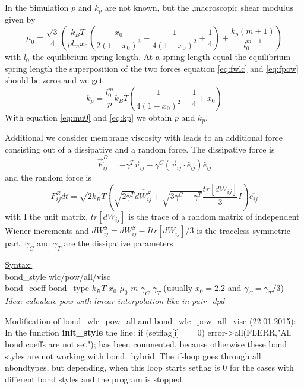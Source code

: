 \documentclass[a4paper,10pt]{scrreprt}
\begin{document}
In the Simulation $p$ and $k_p$ are not known, but the ,macroscopic shear modulus given by
%
\begin{equation}\label{eq:mu0}
	\mu_0 = \frac{\sqrt{3}}{4}\left(\frac{k_BT}{pl_mx_0}\left(\frac{x_0}{2(1-x_0)^3}-\frac{1}{4(1-x_0)^2}+\frac{1}{4}\right) + \frac{k_p(m+1)}{l_0^{m+1}}\right)
\end{equation}
%
with $l_0$ the equilibrium spring length. At a spring length equal the equilibrium spring length the superposition of the two forces equation \ref{eq:fwlc} and \ref{eq:fpow} should be zeros and we get
%
\begin{equation}\label{eq:kp}
	k_p = \frac{l_0^m}{p}k_BT \left(\frac{1}{4(1-x_0)^2}-\frac{1}{4}+x_0\right)
\end{equation}
%
With equation \ref{eq:mu0} and \ref{eq:kp}  we obtain $p$ and $k_p$.

Additional we consider membrane viscosity with leads to an additional force consisting out of a dissipative and a random force. The dissipative force is
% 
\begin{equation}
	\vec{F}^D_{ij} = -\gamma^T\vec{v}_{ij} -\gamma^C(\vec{v}_{ij}\cdot \hat{e}_{ij})\hat{e}_{ij}
\end{equation}
%
and the random force is
%
\begin{equation}
	F^R_{ij}dt = \sqrt{2k_BT}\left(\sqrt{2\gamma^T} \bar{dW_{ij}^S} + \sqrt{3\gamma^C-\gamma^T} \frac{tr[dW_{ij}]}{3}I\right)\hat{e_{ij}}
\end{equation}
%
with I the unit matrix, $tr[dW_{ij}]$ is the trace of a random matrix of independent Wiener increments and $\bar{dW_{ij}^S} = dW_{ij}^S - I tr[dW_{ij}]/3$ is the traceless symmetric part. $\gamma_C$ and $\gamma_T$ are the dissipative parameters

\underline{Syntax:}\\
bond\_style \quad wlc/pow/all/visc\\
bond\_coeff \quad bond\_type $k_BT$ $x_0$ $\mu_0$ $m$ $\gamma_C$ $\gamma_T$ (usually $x_0=2.2$ and $\gamma_C = \gamma_T/3$)\\
\textit{Idea: calculate pow with linear interpolation like in pair\_dpd}

\hspace{2em}

Modification of bond\_wlc\_pow\_all and bond\_wlc\_pow\_all\_visc (22.01.2015):
In the function \textbf{init\_style} the line: if (setflag[i] == 0) error->all(FLERR,"All bond coeffs are not set"); has been commented, because otherwise these bond styles are not working with bond\_hybrid. 
The if-loop goes through all nbondtypes, but depending, when this loop starts setflag is 0 for the cases with different bond styles and the program is stopped.
\end{document}
